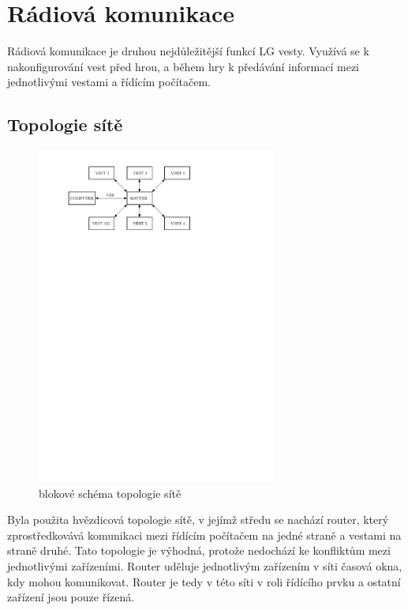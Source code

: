 \chapter{Rádiová komunikace}
Rádiová komunikace je druhou nejdůležitější funkcí LG vesty. Využívá se k nakonfigurování vest před hrou, a během hry k předávání informací mezi jednotlivými vestami a řídícím počítačem.

\section{Topologie sítě}
\begin{figure}[H]
    \begin{center}
        \includegraphics[width=0.7\textwidth]{img/rf-network}
    \end{center}
    \caption{blokové schéma topologie sítě}
\end{figure}
Byla použita hvězdicová topologie sítě, v jejímž středu se nachází router, který zprostředkovává komunikaci mezi řídícím počítačem na jedné straně a vestami na straně druhé. Tato topologie je výhodná, protože nedochází ke konfliktům mezi jednotlivými zařízeními. Router uděluje jednotlivým zařízením v síti časová okna, kdy mohou komunikovat. Router je tedy v této síti v roli řídícího prvku a ostatní zařízení jsou pouze řízená.

